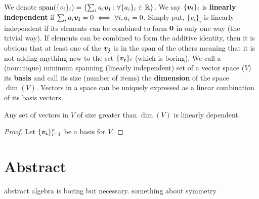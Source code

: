 \begin{definition}
    We denote $\mathrm{span}(\{v_i\}_i)=\{\sum_{i}a_i\boldsymbol{v_i}: \forall\{a_i\}_i\in\mathbb{R}\}$. We say $\{\boldsymbol{v_i}\}_{i}$ is \textbf{linearly independent} if $\sum_{i} a_i\boldsymbol{v_i}=0\iff \forall i,a_i=0$. Simply put, $\{v_i\}_i$ is linearly independent if its elements can be combined to form $\boldsymbol{0}$ in only one way (the trivial way). If elements can be combined to form the additive identity, then it is obvious that at least one of the $\boldsymbol{v_j}$ is in the span of the others meaning that it is not adding anything new to the set $\{\boldsymbol{v_i}\}_i$ (which is boring). We call a (nonunique) minimum spanning (linearly independent) set of a vector space ($V$) its \textbf{basis} and call its size (number of items) the \textbf{dimension} of the space $\dim(V)$. Vectors in a space can be uniquely expressed as a linear combination of its basis vectors.
\end{definition}

\begin{theorem}
    Any set of vectors in $V$ of size greater than $\dim(V)$ is linearly dependent.
\end{theorem}
\begin{proof}
    Let $\{\boldsymbol{v_i}\}_{i=1}^n$ be a basis for $V$.
\end{proof}


\section{Abstract}

abstract algebra is boring but necessary. something about symmetry

